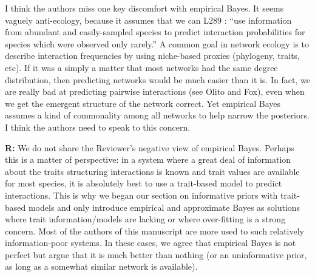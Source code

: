 \documentclass[12pt]{letter}
\newenvironment{refquote}{\bigskip \begin{it}}{\end{it}\smallskip}
\begin{document}
		\begin{refquote}

			I think the authors miss one key discomfort with empirical Bayes. It seems vaguely anti-ecology, because it assumes that we can L289 : “use information from abundant and easily-sampled species to predict interaction probabilities for species which were observed only rarely.”  A common goal in network ecology is to describe interaction frequencies by using niche-based proxies (phylogeny, traits, etc). If it was a simply a matter that most networks had the same degree distribution, then predicting networks would be much easier than it is. In fact, we are really bad at predicting pairwise interactions (see Olito and Fox), even when we get the emergent structure of the network correct. Yet empirical Bayes assumes a kind of commonality among all networks to help narrow the posteriors. I think the authors need to speak to this concern.

		\end{refquote}


		\textbf{R:} We do not share the Reviewer's negative view of empirical Bayes. Perhaps this is a matter of perspective: in a system where a great deal of information about the traits structuring interactions is known and trait values are available for most species, it is absolutely best to use a trait-based model to predict interactions. This is why we began our section on informative priors with trait-based models and only introduce empirical and approximate Bayes as solutions where trait information/models are lacking or where over-fitting is a strong concern. Most of the authors of this manuscript are more used to such relatively information-poor systems. In these cases, we agree that empirical Bayes is not perfect but argue that it is much better than nothing (or an uninformative prior, as long as a somewhat similar network is available).
\end{document}
